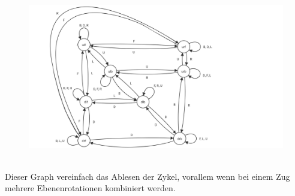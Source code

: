 \documentclass[12pt,a4paper, usenames, dvipsnames]{article}
\begin{document}
\begin{figure}[H]
\includegraphics[scale=0.3]{graph_zug.png}
\end{figure}
\ \\
Dieser Graph vereinfach das Ablesen der Zykel, vorallem wenn bei einem Zug mehrere Ebenenrotationen kombiniert werden.









\end{document}

